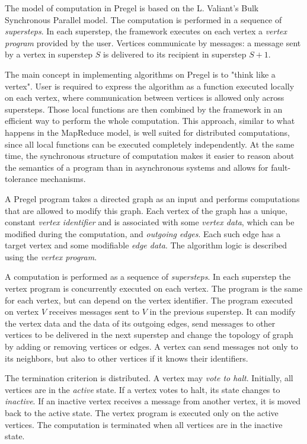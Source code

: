 The model of computation in Pregel is based on the L. Valiant's Bulk Synchronous Parallel model. The computation is performed in a sequence of \emph{supersteps}. In each superstep, the framework executes on each vertex a \emph{vertex program} provided by the user. Vertices communicate by messages: a message sent by a vertex in superstep $S$ is delivered to its recipient in superstep $S+1$.


The main concept in implementing algorithms on Pregel is to "think like a vertex". User is required to express the algorithm as a function executed locally on each vertex, where communication between vertices is allowed only across supersteps. Those local functions are then combined by the framework in an efficient way to perform the whole computation. This approach, similar to what happens in the MapReduce model, is well suited for distributed computations, since all local functions can be executed completely independently. At the same time, the synchronous structure of computation makes it easier to reason about the semantics of a program than in asynchronous systems and allows for fault-tolerance mechanisms.

A Pregel program takes a directed graph as an input and performs computations that are allowed to modify this graph.
Each vertex of the graph has a unique, constant \emph{vertex identifier} and is associated with some \emph{vertex data}, which can be modified during the computation, and \emph{outgoing edges}. Each such edge has a target vertex and some modifiable \emph{edge data}. The algorithm logic is described using the \emph{vertex program}.

A computation is performed as a sequence of \emph{supersteps}. In each superstep the vertex program is concurrently executed on each vertex. The program is the same for each vertex, but can depend on the vertex identifier. The program executed on vertex $V$ receives messages sent to $V$ in the previous superstep. It can modify the vertex data and the data of its outgoing edges, send messages to other vertices to be delivered in the next superstep and change the topology of graph by adding or removing vertices or edges. A vertex can send messages not only to its neighbors, but also to other vertices if it knows their identifiers.

The termination criterion is distributed. A vertex may \emph{vote to halt}. Initially, all vertices are in the \emph{active} state. If a vertex votes to halt, its state changes to \emph{inactive}. If an inactive vertex receives a message from another vertex, it is moved back to the active state. The vertex program is executed only on the active vertices. The computation is terminated when all vertices are in the inactive state.


